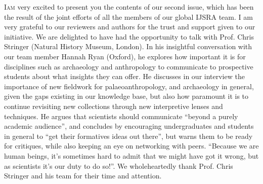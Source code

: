 \def\IJSRAidentifier{\currfilebase} %
\def\shorttitle{Issue Presentation}
\def\maintitle{Presentation of the Second Issue of IJSRA}
\def\cmail{gonzalo.linaresmatas@st-hughs.ox.ac.uk}
\def\authorone{Gonzalo Linares Matás}
\def\bioone{\authorone is a third-year undergraduate student reading the BA Archaeology \& Anthropology at St~Hugh’s College, University of Oxford (UK). 
He was the former President of the Oxford University Archaeology Society (Michaelmas 2015), and he has recently been invited to join the WAC (World Archaeology Congress) Student Committee. 
He is particularly interested in the socio-political contexts of heritage management and ownership, contemporary archaeological theory, and the histories of the academic disciplines of archaeology and anthropology as practical modes of inquiry. 
He is doing his undergraduate dissertation on the socio-economic dimensions of early bone technology, focusing on the late Early Pleistocene assemblage at the site of Cueva Negra del Estrecho del Río Quípar (Murcia, Spain). 
He is also very interested in transforming the academic publishing landscape.}
\def\affilone{Executive Editor, International Journal of Student Research in Archaeology
\\St. Hugh’s College, University of Oxford}


\IJSRAopening%
\lettrine{I}{am} very excited to present you the contents of our second issue, which has been the result of the joint efforts of all the members of our global IJSRA team. I am very grateful to our reviewers and authors for the trust and support given to our initiative.
We are delighted to have had the opportunity to talk with Prof. Chris Stringer (Natural History Museum, London). In his insightful conversation with our team member Hannah Ryan (Oxford), he explores how important it is for disciplines such as archaeology and anthropology to communicate to prospective students about what insights they can offer. He discusses in our interview the importance of new fieldwork for palaeoanthropology, and archaeology in general, given the gaps existing in our knowledge base, but also how paramount it is to continue revisiting new collections through new interpretive lenses and techniques. He argues that scientists should communicate “beyond a purely academic audience”, and concludes by encouraging undergraduates and students in general to “get their formatives ideas out there”, but warns them to be ready for critiques, while also keeping an eye on networking with peers. “Because we are human beings, it’s sometimes hard to admit that we might have got it wrong, but as scientists it’s our duty to do so!”. We wholeheartedly thank Prof. Chris Stringer and his team for their time and attention.

